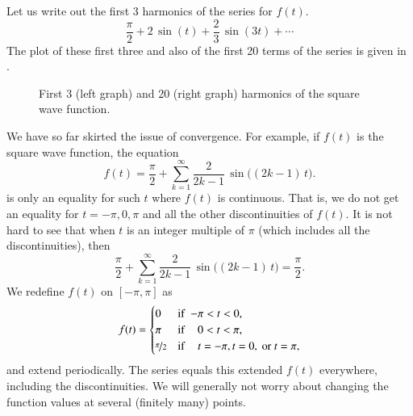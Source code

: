 \documentclass[12pt]{book}
\begin{document}
\begin{example}
Let us write out the first 3 harmonics of the series for $f(t)$.
\begin{equation*}
\frac{\pi}{2}
+
2 \, \sin (t)
+
\frac{2}{3} \, \sin (3t)
+ \cdots
\end{equation*}
The plot of these first three and also of the first 20 terms of the series
is given in
.

\begin{figure}[h!t]
\capstart
\begin{center}
\qquad
{}
\caption{First 3 (left graph) and 20 (right graph) harmonics of the
square wave function.\label{ts:squarewavefsfig}}
\end{center}
\end{figure}
\end{example}

We have so far skirted the issue of convergence.  For example,
if $f(t)$ is the square wave function,
the equation
\begin{equation*}
f(t) = 
\frac{\pi}{2} + \sum_{k=1}^\infty
\frac{2}{2k-1} \,
\sin \bigl( (2k-1)\, t \bigr) .
\end{equation*}
is only an equality for such $t$ where $f(t)$ is continuous.  That is,
we do not get an equality for $t=-\pi,0,\pi$ and all the other discontinuities
of $f(t)$.  It is not hard to see that when $t$ is an integer multiple of
$\pi$ (which includes all the discontinuities), then
\begin{equation*}
\frac{\pi}{2} + \sum_{k=1}^\infty
\frac{2}{2k-1} \,
\sin \bigl( (2k-1)\, t \bigr) = \frac{\pi}{2} .
\end{equation*}
We redefine $f(t)$ on $[-\pi,\pi]$ as
\begin{equation*}
f(t) =
\begin{cases}
0 & \text{if } \; {-\pi} < t < 0 , \\
\pi & \text{if } \; \phantom{-}0 < t < \pi , \\
\nicefrac{\pi}{2} & \text{if } \; \phantom{-}t = -\pi, 
t = 0,\text{ or }
t = \pi,
\end{cases}
\end{equation*}
and extend periodically.
The series equals this extended $f(t)$ everywhere, including the
discontinuities.
We will generally not worry about changing the function values
at several (finitely many) points.
\end{document}
